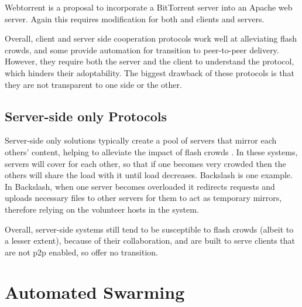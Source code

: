 Webtorrent \cite{webtorrent} is a proposal to incorporate a BitTorrent server into an Apache web server.  Again this requires modification for both and clients and servers.

Overall, client and server side cooperation protocols work well at alleviating flash crowds, and some provide automation for transition to peer-to-peer delivery.  
However, they require both the server and the client to understand the protocol, which hinders their adoptability.  
The biggest drawback of these protocols is that they are not transparent to one side or the other.

\subsection{Server-side only Protocols}

Server-side only solutions typically create a pool of servers that mirror each others' content, helping to alleviate the impact of flash crowds \cite{backslash, dotSlash}.  
In these systems, servers will cover for each other, so that if one becomes very crowded then the others will share the load with it until load decreases.  Backslash \cite{backslash} is one example.  In Backslash, when one server becomes overloaded it redirects requests and uploads necessary files to other servers for them to act as temporary mirrors, therefore relying on the volunteer hosts in the system.  

Overall, server-side systems still tend to be susceptible to flash crowds (albeit to a lesser extent), because of their collaboration, and are built to serve clients that are not p2p enabled, so offer no transition.

\section {Automated Swarming}\label{section:solution}

